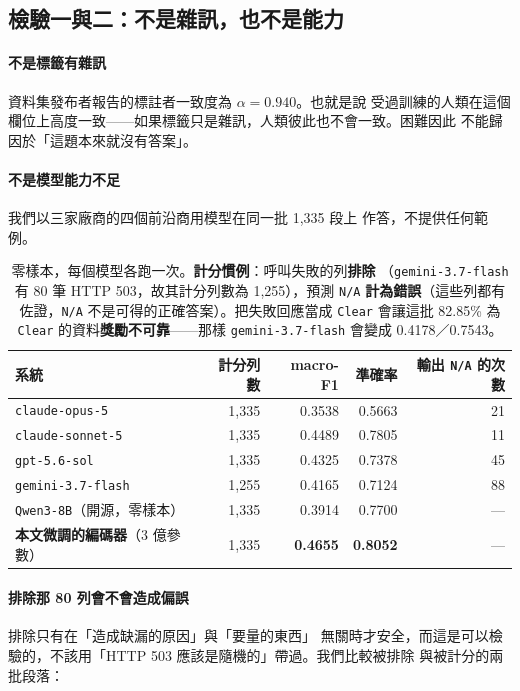 \documentclass[11pt,a4paper]{ctexart}
\newcommand{\fn}[1]{\texttt{#1}}
\begin{document}
\subsection{檢驗一與二：不是雜訊，也不是能力}

\paragraph{不是標籤有雜訊} 資料集發布者報告的標註者一致度為 $\alpha = 0.940$。也就是說
受過訓練的人類在這個欄位上高度一致——如果標籤只是雜訊，人類彼此也不會一致。困難因此
不能歸因於「這題本來就沒有答案」。

\paragraph{不是模型能力不足} 我們以三家廠商的四個前沿商用模型在同一批 1,335 段上
作答，不提供任何範例。

\begin{table}[h]
\centering\small
\begin{tabular}{@{}lrrrr@{}}
\toprule
系統 & 計分列數 & macro-F1 & 準確率 & 輸出 \fn{N/A} 的次數 \\
\midrule
\fn{claude-opus-5} & 1{,}335 & 0.3538 & 0.5663 & 21 \\
\fn{claude-sonnet-5} & 1{,}335 & 0.4489 & 0.7805 & 11 \\
\fn{gpt-5.6-sol} & 1{,}335 & 0.4325 & 0.7378 & 45 \\
\fn{gemini-3.7-flash} & 1{,}255 & 0.4165 & 0.7124 & 88 \\
\fn{Qwen3-8B}（開源，零樣本） & 1{,}335 & 0.3914 & 0.7700 & --- \\
\midrule
\rowcolor{green!12}
\textbf{本文微調的編碼器}（3 億參數） & 1{,}335 & \textbf{0.4655} & \textbf{0.8052} & --- \\
\bottomrule
\end{tabular}
\caption{零樣本，每個模型各跑一次。\textbf{計分慣例}：呼叫失敗的列\textbf{排除}
（\fn{gemini-3.7-flash} 有 80 筆 HTTP 503，故其計分列數為 1{,}255），預測 \fn{N/A}
\textbf{計為錯誤}（這些列都有佐證，\fn{N/A} 不是可得的正確答案）。把失敗回應當成
\fn{Clear} 會讓這批 82.85\% 為 \fn{Clear} 的資料\textbf{獎勵不可靠}——那樣
\fn{gemini-3.7-flash} 會變成 0.4178／0.7543。}
\end{table}

\paragraph{排除那 80 列會不會造成偏誤} 排除只有在「造成缺漏的原因」與「要量的東西」
無關時才安全，而這是可以檢驗的，不該用「HTTP 503 應該是隨機的」帶過。我們比較被排除
與被計分的兩批段落：
\end{document}
